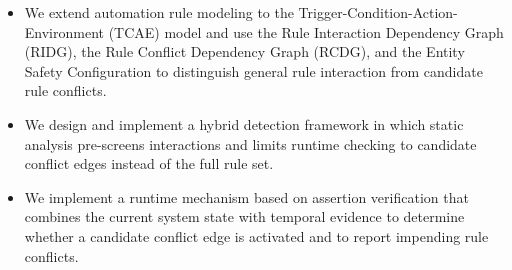 \begin{itemize}
	\item We extend automation rule modeling to the Trigger-Condition-Action-Environment (TCAE) model and use the Rule Interaction Dependency Graph (RIDG), the Rule Conflict Dependency Graph (RCDG), and the Entity Safety Configuration to distinguish general rule interaction from candidate rule conflicts.

	\item We design and implement a hybrid detection framework in which static analysis pre-screens interactions and limits runtime checking to candidate conflict edges instead of the full rule set.

	\item We implement a runtime mechanism based on assertion verification that combines the current system state with temporal evidence to determine whether a candidate conflict edge is activated and to report impending rule conflicts.
\end{itemize}